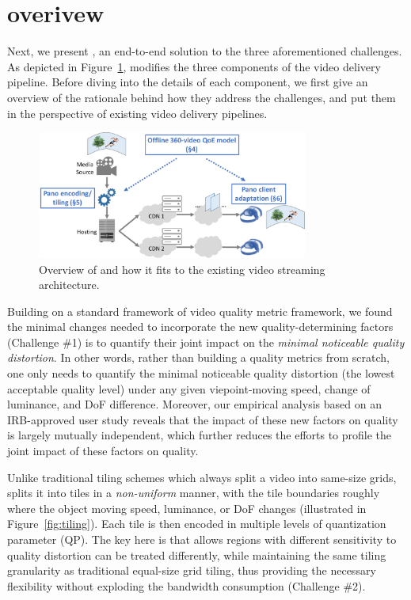 
\section{\name overivew}

Next, we present {\em \name}, an end-to-end solution to the three aforementioned challenges.
As depicted in Figure~\ref{fig:overview}, \name modifies the three components of the video delivery pipeline. 
Before diving into the details of each component, we first give an overview of the rationale behind how they address the challenges, and put them in the perspective of existing video delivery pipelines. 



\begin{figure}[t!]
  \centering
  \includegraphics[width=3.5in]{figures/overview.pdf}
  \caption{Overview of \name and how it fits to the existing \vr video streaming architecture.}
  \label{fig:overview}
  \end{figure}

Building on a standard framework of video quality metric framework, we found the minimal changes needed to incorporate the new quality-determining factors (Challenge \#1) is to quantify their joint impact on the {\em minimal noticeable quality distortion}.
In other words, rather than building a \vrvideo quality metrics from scratch, one only needs to quantify the minimal noticeable quality distortion (\ie the lowest acceptable quality level) under any given viepoint-moving speed, change of luminance, and DoF difference. 
Moreover, our empirical analysis based on an IRB-approved user study reveals that the impact of these new factors on quality is largely mutually independent, which further reduces the efforts to profile the joint impact of these factors on \vrvideo quality.

Unlike traditional tiling schemes which always split a video into same-size grids, \name splits it into tiles in a {\em non-uniform} manner, with the tile boundaries roughly where the object moving speed, luminance, or DoF changes (illustrated in Figure~\ref{fig:tiling}). 
Each tile is then encoded in multiple levels of quantization parameter (QP). %
The key here is that \name allows regions with different sensitivity to quality distortion can be treated differently, while maintaining the same tiling granularity as traditional equal-size grid tiling, thus providing the necessary flexibility without exploding the bandwidth consumption (Challenge \#2).



